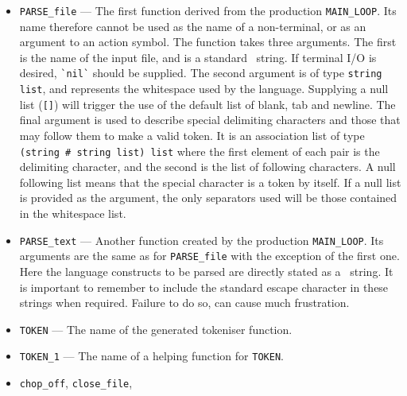 \begin{itemize}
     \begin{itemize}
     \item \verb"PARSE_file"     
        \normalsize
        --- The first
        function derived from
        the production \verb"MAIN_LOOP".  Its 
        name therefore cannot be used
        as the name of a non-terminal, or as an argument to an action symbol.
        The function takes three arguments.  The first is the name of the
        input file, and is a standard \ML\ string.  If terminal {\small I/O} 
        is desired, \verb"`nil`" should be supplied.  The second argument is
        of type \verb"string list", and represents the whitespace used
        by the language.  Supplying a null list (\verb"[]") will trigger the 
        use of the default list of blank, tab and newline.  The final argument
        is used to describe special delimiting characters and those that may
        follow them to make a valid token.
        It is an association list of type
        \verb"(string # string list) list" where the first element of
        each pair is the delimiting character, and the second is the list
        of following characters.  A null following list means that the special
        character is a token by itself. If a null list is provided as the 
        argument, the only separators used will be those contained in the 
        whitespace list.
     \item \verb"PARSE_text"
        \normalsize
        --- Another
        function created by the production 
        \verb"MAIN_LOOP".  Its 
        arguments are the same as for 
        \verb"PARSE_file" with the 
        exception
        of the first one.  Here the language constructs
        to be parsed are directly stated as a \ML\ string.
        It is important to remember to include the standard escape 
        character in these strings when required.  Failure to do so, can cause
        much frustration.
     \item \verb"TOKEN"
        \normalsize--- The name of the generated tokeniser function.
     \item \verb"TOKEN_1"        
        \normalsize--- The name of a helping
        function for \verb"TOKEN".
     \item {\raggedright \verb"chop_off", \verb"close_file", 
}
\end{itemize}
\end{itemize}
